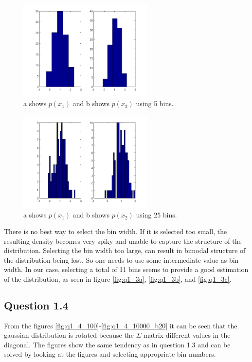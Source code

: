 \documentclass[a4paper, 10pt, final]{article}
\begin{document}
\begin{figure}[!htpb]
  \centering
  \includegraphics[width=0.6\textwidth]{images/q1_3b}
  \caption{a shows $p(x_1)$ and b shows $p(x_2)$ using 5 bins.}
  \label{fig:q3_3b}
\end{figure}

\begin{figure}[!htpb]
  \centering
  \includegraphics[width=0.6\textwidth]{images/q1_3c}
  \caption{a shows $p(x_1)$ and b shows $p(x_2)$ using 25 bins.}
  \label{fig:q3_3c}
\end{figure}

There is no best way to select the bin width. If it is selected too
small, the resulting density becomes very spiky and unable to capture
the structure of the distribution. Selecting the bin width too large,
can result in bimodal structure of the distribution being lost. So one
needs to use some intermediate value as bin width. In our case,
selecting a total of 11 bins seems to provide a good estimation of the
distribution, as seen in figure \ref{fig:q1_3a}, \ref{fig:q1_3b}, and \ref{fig:q1_3c}.

\subsection*{Question 1.4}

From the figures \ref{fig:q1_4_100}-\ref{fig:q1_4_10000_b20} it can be seen that
the gaussian distribution is rotated because the $\Sigma$-matrix different
values in the diagonal. The figures show the same tendency as in question 1.3
and can be solved by looking at the figures and selecting appropriate bin
numbers.
\end{document}
